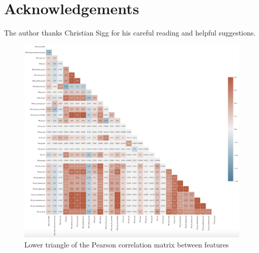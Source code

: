 \documentclass[10pt,conference,compsocconf]{IEEEtran}
\begin{document}
\section*{Acknowledgements}
The author thanks Christian Sigg for his careful reading and helpful
suggestions.




\begin{figure}[h]
  \includegraphics[scale = 0.75]{latex-example-paper/corr_matrix.png}
  \caption{Lower triangle of the Pearson correlation matrix between features}
  \label{corr_matrix}
\end{figure}
\end{document}
